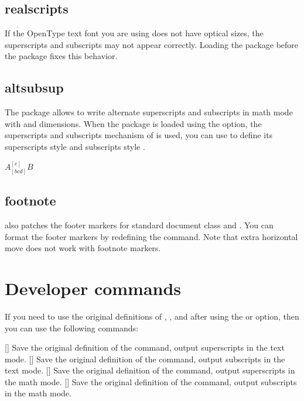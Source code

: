 \documentclass[load-preamble+]{cnltx-doc}
\begin{document}
\subsection{realscripts}
If the OpenType text font you are using does not have optical sizes, the superscripts and subscripts may not appear correctly. Loading the  package before the  package fixes this behavior.
\begin{codehigh}
\usepackage{realscripts,spbmark}
\end{codehigh}

\subsection{altsubsup}
The  package allows to write alternate superscripts and subscripts in math mode with \code{\^{}} and \code{\_{}} dimensions. When the package is loaded using the  option, the superscripts and subscripts mechanism of  is used, you can use  to define its superscripts style  and subscripts style .
\begin{demohigh}
$A_[bcd]^[e]B$
\end{demohigh}

\subsection{footnote}
 also patches the footer markers for standard document class and . You can format the footer markers by redefining the  command. Note that extra horizontal move does not work with footnote markers.

\section{Developer commands}
If you need to use the original definitions of , ,  and  after using the  or  option, then you can use the following commands:
\begin{commands}
  []
  Save the original definition of the  command, output superscripts in the text mode.
  []
  Save the original definition of the  command, output subscripts in the text mode.
  []
  Save the original definition of the  command, output superscripts in the math mode.
  []
  Save the original definition of the  command, output subscripts in the math mode.
\end{commands}
\end{document}
